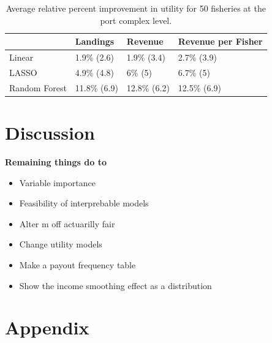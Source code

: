 \documentclass[
  letterpaper,
  DIV=11,
  numbers=noendperiod]{scrartcl}
\begin{document}
\hypertarget{tbl-utility-port}{}
\begin{table}
\caption{\label{tbl-utility-port}Average relative percent improvement in utility for 50 fisheries at the
port complex level. }\tabularnewline

\centering
\begin{tabular}{llll}
\toprule
 & Landings & Revenue & Revenue per Fisher\\
\midrule
Linear & 1.9\%
(2.6) & 1.9\%
(3.4) & 2.7\%
(3.9)\\
LASSO & 4.9\%
(4.8) & 6\%
(5) & 6.7\%
(5)\\
Random Forest & 11.8\%
(6.9) & 12.8\%
(6.2) & 12.5\%
(6.9)\\
\bottomrule
\end{tabular}
\end{table}

\hypertarget{sec-discussion}{%
\section{Discussion}\label{sec-discussion}}

\textbf{Remaining things do to}

\begin{itemize}
\item
  Variable importance
\item
  Feasibility of interprebable models
\item
  Alter m off actuarilly fair
\item
  Change utility models
\item
  Make a payout frequency table
\item
  Show the income smoothing effect as a distribution
\end{itemize}

\hypertarget{appendix}{%
\section{Appendix}\label{appendix}}
\end{document}
